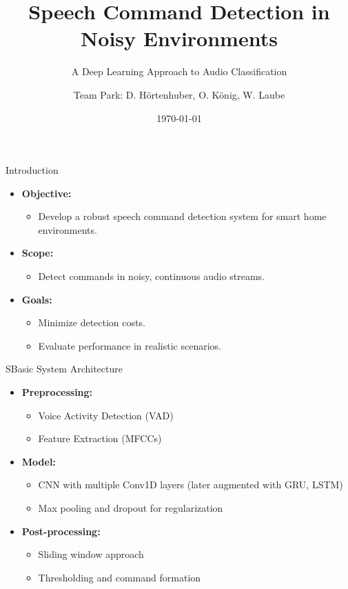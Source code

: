 \documentclass{beamer}
\title{Speech Command Detection in Noisy Environments}
\subtitle{A Deep Learning Approach to Audio Classification}
\author{Team Park: D. Hörtenhuber, O. König, W. Laube}
\institute{JKU \\ MLPC}
\date{\today}
\begin{document}
\begin{frame}
  \titlepage
\end{frame}

\begin{frame}{Introduction}
  \begin{itemize}
    \item \textbf{Objective:}
          \begin{itemize}
          \item Develop a robust speech command detection system for smart home environments.
            \end{itemize}
    \item \textbf{Scope:} 
          \begin{itemize}
    \item Detect commands in noisy, continuous audio streams.
          \end{itemize}
    \item \textbf{Goals:}
      \begin{itemize}
        \item Minimize detection costs.
        \item Evaluate performance in realistic scenarios.
      \end{itemize}
  \end{itemize}
\end{frame}

\begin{frame}{SBasic System Architecture}
  \begin{itemize}
    \item \textbf{Preprocessing:}
      \begin{itemize}
        \item Voice Activity Detection (VAD)
        \item Feature Extraction (MFCCs)
      \end{itemize}
    \item \textbf{Model:}
      \begin{itemize}
        \item CNN with multiple Conv1D layers (later augmented with GRU, LSTM)
        \item Max pooling and dropout for regularization
      \end{itemize}
    \item \textbf{Post-processing:}
      \begin{itemize}
        \item Sliding window approach
        \item Thresholding and command formation
      \end{itemize}
  \end{itemize}
\end{frame}
\end{document}

